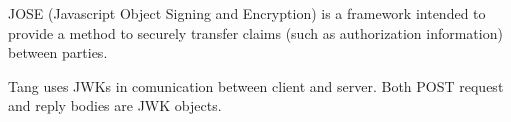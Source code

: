 JOSE (Javascript Object Signing and Encryption) is a framework intended to provide a method to securely transfer claims (such as authorization information) between parties.

Tang uses JWKs in comunication between client and server. Both POST request and reply bodies are JWK objects.

\newpage
